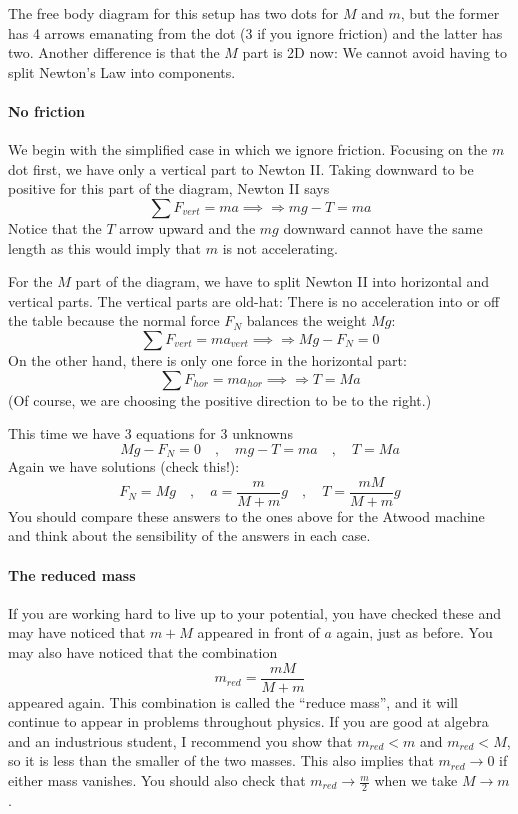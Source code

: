 The free body diagram for this setup has two dots for $M$ and $m$, but the former has 4 arrows emanating from the dot (3 if you ignore friction) and the latter has two. Another difference is that the $M$ part is 2D now: We cannot avoid having to split Newton's Law into components. 


\paragraph{No friction} 
We begin with the simplified case in which we ignore friction.
Focusing on the $m$ dot first, we have only a vertical part to Newton II. Taking downward to be positive for this part of the diagram, Newton II says
$$
∑F_{vert} = ma
\implies{⇒}
mg - T = ma
$$
Notice that the $T$ arrow upward and the $mg$ downward cannot have the same length as this would imply that $m$ is not accelerating. 

For the $M$ part of the diagram, we have to split Newton II into horizontal and vertical parts. The vertical parts are old-hat: There is no acceleration into or off the table because the normal force $F_N$ balances the weight $Mg$:
$$
∑ F_{vert} = ma_{vert}
\implies{⇒}
Mg - F_N = 0
$$
On the other hand, there is only one force in the horizontal part:
$$
∑ F_{hor} = ma_{hor}
\implies{⇒}
T = Ma
$$
(Of course, we are choosing the positive direction to be to the right.)

This time we have 3 equations for 3 unknowns 
$$
Mg - F_N = 0
\quad, \quad
mg - T = ma
\quad, \quad
T = Ma
$$
Again we have solutions (check this!):
$$
F_N = Mg 
\quad, \quad
a = \frac m{M+m} g 
\quad, \quad
T = \frac {mM}{M+m} g 
$$
You should compare these answers to the ones above for the Atwood machine and think about the sensibility of the answers in each case.

\paragraph{The reduced mass}
If you are working hard to live up to your potential, you have checked these and may have noticed that $m+M$ appeared in front of $a$ again, just as before. You may also have noticed that the combination 
$$
m_{red} = \frac {mM}{M+m} 
$$
appeared again. This combination is called the “reduce mass”, and it will continue to appear in problems throughout physics.
If you are good at algebra and an industrious student, I recommend you show that $m_{red} < m$ and $m_{red}<M$, so it is less than the smaller of the two masses. This also implies that $m_{red}→ 0$ if either mass vanishes. 
You should also check that $m_{red} → \frac m2$ when we take $M→ m$.

